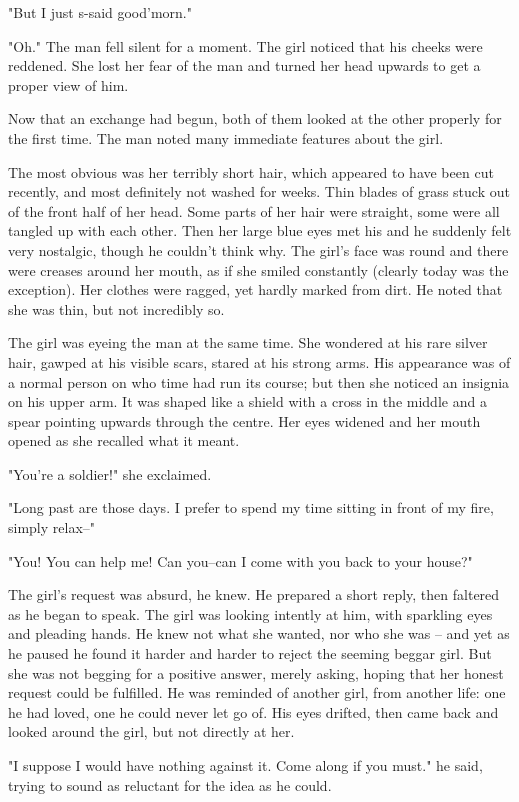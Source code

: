 "But I just s-said good'morn."

"Oh." The man fell silent for a moment. The girl noticed that his cheeks were
reddened. She lost her fear of the man and turned her head upwards to get a
proper view of him.

Now that an exchange had begun, both of them looked at the other properly for
the first time. The man noted many immediate features about the girl.

The most obvious was her terribly short hair, which appeared to have been cut
recently, and most definitely not washed for weeks. Thin blades of grass stuck
out of the front half of her head. Some parts of her hair were straight, some
were all tangled up with each other. Then her large blue eyes met his and he
suddenly felt very nostalgic, though he couldn't think why. The girl's face was
round and there were creases around her mouth, as if she smiled constantly
(clearly today was the exception). Her clothes were ragged, yet hardly marked
from dirt. He noted that she was thin, but not incredibly so.

The girl was eyeing the man at the same time. She wondered at his rare silver
hair, gawped at his visible scars, stared at his strong arms. His appearance was
of a normal person on who time had run its course; but then she noticed an
insignia on his upper arm. It was shaped like a shield with a cross in the
middle and a spear pointing upwards through the centre. Her eyes widened and her
mouth opened as she recalled what it meant.

"You're a soldier!" she exclaimed.

"Long past are those days. I prefer to spend my time sitting in front of my
fire, simply relax--"

"You! You can help me! Can you--can I come with you back to your house?"

The girl's request was absurd, he knew. He prepared a short reply, then faltered
as he began to speak. The girl was looking intently at him, with sparkling eyes
and pleading hands. He knew not what she wanted, nor who she was -- and yet as
he paused he found it harder and harder to reject the seeming beggar girl. But
she was not begging for a positive answer, merely asking, hoping that her honest
request could be fulfilled. He was reminded of another girl, from another life:
one he had loved, one he could never let go of. His eyes drifted, then came back
and looked around the girl, but not directly at her.

"I suppose I would have nothing against it. Come along if you must." he said,
trying to sound as reluctant for the idea as he could.
